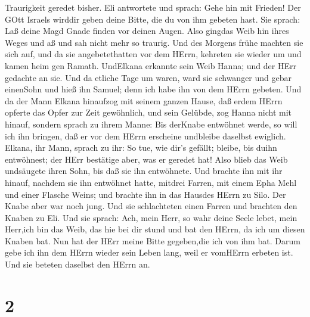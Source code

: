 Traurigkeit geredet bisher.  Eli antwortete und sprach:
Gehe hin mit Frieden! Der GOtt Israels wirddir geben deine Bitte, die du
von ihm gebeten hast.  Sie sprach: Laß deine Magd Gnade
finden vor deinen Augen. Also gingdas Weib hin ihres Weges und aß und
sah nicht mehr so traurig.  Und des Morgens frühe machten
sie sich auf, und da sie angebetethatten vor dem HErrn, kehreten sie
wieder um und kamen heim gen Ramath. UndElkana erkannte sein Weib Hanna;
und der HErr gedachte an sie.  Und da etliche Tage um
waren, ward sie schwanger und gebar einenSohn und hieß ihn Samuel; denn
ich habe ihn von dem HErrn gebeten.  Und da der Mann Elkana
hinaufzog mit seinem ganzen Hause, daß erdem HErrn opferte das Opfer zur
Zeit gewöhnlich, und sein Gelübde,  zog Hanna nicht mit
hinauf, sondern sprach zu ihrem Manne: Bis derKnabe entwöhnet werde, so
will ich ihn bringen, daß er vor dem HErrn erscheine undbleibe daselbst
ewiglich.  Elkana, ihr Mann, sprach zu ihr: So tue, wie
dir's gefällt; bleibe, bis duihn entwöhnest; der HErr bestätige aber,
was er geredet hat! Also blieb das Weib undsäugete ihren Sohn, bis daß
sie ihn entwöhnete.  Und brachte ihn mit ihr hinauf,
nachdem sie ihn entwöhnet hatte, mitdrei Farren, mit einem Epha Mehl und
einer Flasche Weins; und brachte ihn in das Hausdes HErrn zu Silo. Der
Knabe aber war noch jung.  Und sie schlachteten einen
Farren und brachten den Knaben zu Eli.  Und sie sprach:
Ach, mein Herr, so wahr deine Seele lebet, mein Herr,ich bin das Weib,
das hie bei dir stund und bat den HErrn,  da ich um diesen
Knaben bat. Nun hat der HErr meine Bitte gegeben,die ich von ihm bat.
 Darum gebe ich ihn dem HErrn wieder sein Leben lang, weil
er vomHErrn erbeten ist. Und sie beteten daselbst den HErrn an.

\hypertarget{section-1}{%
\section{2}\label{section-1}}

